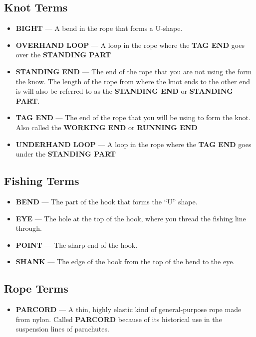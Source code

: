 \documentclass[12pt]{article}
\begin{document}
\subsection{Knot Terms}
\begin{itemize}
\item \textbf{BIGHT} --- A bend in the rope that forms a U-shape.
\item \textbf{OVERHAND LOOP} --- A loop in the rope where the \textbf{TAG END} goes over the \textbf{STANDING PART}
\item \textbf{STANDING END} --- The end of the rope that you are not using the form the know. The length of the rope from where the knot ends to the other end is will also be referred to as the \textbf{STANDING END} or \textbf{STANDING PART}.
\item \textbf{TAG END} --- The end of the rope that you will be using to form the knot. Also called the \textbf{WORKING END} or \textbf{RUNNING END}
\item \textbf{UNDERHAND LOOP} --- A loop in the rope where the \textbf{TAG END} goes under the \textbf{STANDING PART}

\end{itemize}

\subsection{Fishing Terms}
\begin{itemize}
\item \textbf{BEND} --- The part of the hook that forms the ``U'' shape.
\item \textbf{EYE} --- The hole at the top of the hook, where you thread the fishing line through.
\item \textbf{POINT} --- The sharp end of the hook.
\item \textbf{SHANK} --- The edge of the hook from the top of the bend to the eye.
\end{itemize}

\subsection{Rope Terms}
\begin{itemize}
\item \textbf{PARCORD} --- A thin, highly elastic kind of general-purpose rope made from nylon. Called \textbf{PARCORD} because of its historical use in the suspension lines of parachutes.
\end{itemize}
\end{document}
